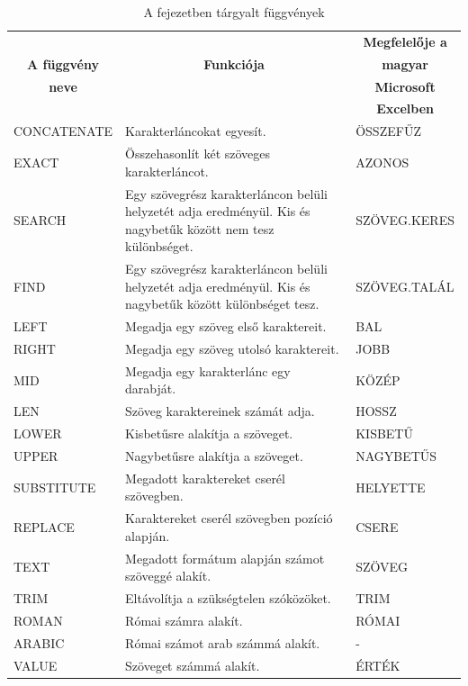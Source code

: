 \begin{table}[!h]
\begin{center}
\caption{A fejezetben tárgyalt függvények}\label{9-fejezetFüggvények}
\begin{tabular}{|m{3cm}|m{8cm}|m{3cm}|}
\hline
 & & \multicolumn{1}{c|}{\textbf{Megfelelője a}} \\
\multicolumn{1}{|c|}{\textbf{A függvény}}&
\multicolumn{1}{c|}{\textbf{Funkciója}}&
\multicolumn{1}{c|}{\textbf{magyar}} \\
\multicolumn{1}{|c|}{\textbf{neve}} & &
\multicolumn{1}{c|}{\textbf{Microsoft}} \\
 & & \multicolumn{1}{c|}{\textbf{Excelben}} \\
\hline
CONCATENATE & Karakterláncokat egyesít. & ÖSSZEFŰZ\\ \hline
EXACT & Összehasonlít két szöveges karakterláncot. & AZONOS\\ \hline
SEARCH & Egy szövegrész karakterláncon belüli helyzetét adja eredményül.
Kis és nagybetűk között nem tesz különbséget. & SZÖVEG.KERES\\ \hline
FIND & Egy szövegrész karakterláncon belüli helyzetét adja
eredményül. Kis és nagybetűk között különbséget tesz. & SZÖVEG.TALÁL\\ \hline
LEFT & Megadja egy szöveg első karaktereit. & BAL\\ \hline
RIGHT & Megadja egy szöveg utolsó karaktereit. & JOBB\\ \hline
MID & Megadja egy karakterlánc egy darabját. & KÖZÉP\\ \hline
LEN & Szöveg karaktereinek számát adja. & HOSSZ\\ \hline
LOWER & Kisbetűsre alakítja a szöveget. & KISBETŰ\\ \hline
UPPER & Nagybetűsre alakítja a szöveget. & NAGYBETŰS\\ \hline
SUBSTITUTE & Megadott karaktereket cserél szövegben. & HELYETTE\\ \hline
REPLACE & Karaktereket cserél szövegben pozíció alapján. & CSERE\\ \hline
TEXT & Megadott formátum alapján számot szöveggé alakít. & SZÖVEG\\ \hline
TRIM & Eltávolítja a szükségtelen szóközöket. & TRIM\\ \hline
ROMAN & Római számra alakít. & RÓMAI\\ \hline
ARABIC & Római számot arab számmá alakít. & {}-\\ \hline
VALUE & Szöveget számmá alakít. & ÉRTÉK\\ \hline
\end{tabular}
\end{center}
\end{table}

